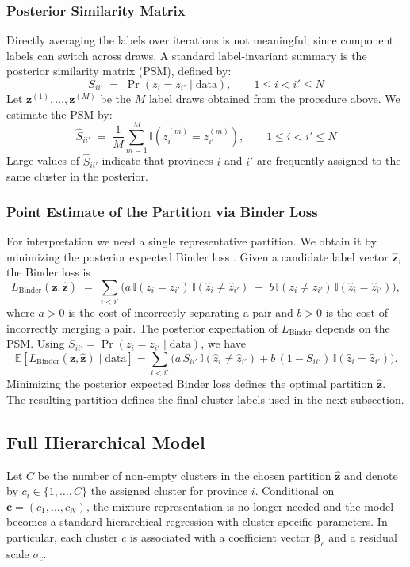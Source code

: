 \subsubsection{Posterior Similarity Matrix}
Directly averaging the labels over iterations is not meaningful, since component labels can switch across draws.
A standard label-invariant summary is the posterior similarity matrix (PSM), defined by:
\[
S_{ii'} \;=\; \Pr(z_i=z_{i'} \mid \text{data}), \qquad 1\le i<i'\le N
\]
Let $\mathbf{z}^{(1)},\dots,\mathbf{z}^{(M)}$ be the $M$ label draws obtained from the procedure above.
We estimate the PSM by:
\[
\widehat{S}_{ii'}
\;=\;
\frac{1}{M}\sum_{m=1}^M \mathbb{I}\!\left(z_i^{(m)} = z_{i'}^{(m)}\right), \qquad 1\le i<i'\le N
\]
Large values of $\widehat{S}_{ii'}$ indicate that provinces $i$ and $i'$ are frequently assigned to the same cluster in the posterior.

\subsubsection{Point Estimate of the Partition via Binder Loss}

For interpretation we need a single representative partition.
We obtain it by minimizing the posterior expected Binder loss \cite{Binder_1978}.
Given a candidate label vector $\hat{\mathbf{z}}$, the Binder loss is
\[
L_{\mathrm{Binder}}(\mathbf{z},\hat{\mathbf{z}})
\;=\;
\sum_{i<i'}
\Big(
a\,\mathbb{I}(z_i=z_{i'})\,\mathbb{I}(\hat{z}_i\neq \hat{z}_{i'})
\;+\;
b\,\mathbb{I}(z_i\neq z_{i'})\,\mathbb{I}(\hat{z}_i=\hat{z}_{i'})
\Big),
\]
where $a>0$ is the cost of incorrectly separating a pair and $b>0$ is the cost of incorrectly merging a pair.
The posterior expectation of $L_{\mathrm{Binder}}$ depends on the PSM.
Using $S_{ii'}=\Pr(z_i=z_{i'}\mid\text{data})$, we have
\[
\mathbb{E}\!\left[L_{\mathrm{Binder}}(\mathbf{z},\hat{\mathbf{z}})\mid \text{data}\right]
=
\sum_{i<i'}
\Big(
a\,S_{ii'}\,\mathbb{I}(\hat{z}_i\neq \hat{z}_{i'})
+
b\,(1-S_{ii'})\,\mathbb{I}(\hat{z}_i=\hat{z}_{i'})
\Big).
\]
Minimizing the posterior expected Binder loss defines the optimal partition $\hat{\mathbf{z}}$. The resulting partition defines the final cluster labels used in the next subsection.

\subsection{Full Hierarchical Model}
\label{subsec:full_model}
Let $C$ be the number of non-empty clusters in the chosen partition $\hat{\mathbf z}$ and denote by $c_i \in \{1,\dots,C\}$ the assigned cluster for province $i$.
Conditional on $\mathbf c=(c_1,\dots,c_N)$, the mixture representation is no longer needed and the
model becomes a standard hierarchical regression with cluster-specific parameters.
In particular, each cluster $c$ is associated with a coefficient vector $\boldsymbol{\beta}_c$
and a residual scale $\sigma_c$.



